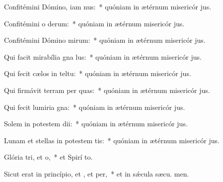 \item Confitémini Dómino, iam nus:~* quóniam in ætérnum misericór jus.
\item Confitémini o derum:~* quóniam in ætérnum misericór jus.
\item Confitémini Dómino mirum:~* quóniam in ætérnum misericór jus.
\item Qui facit mirabília gna lus:~* quóniam in ætérnum misericór jus.
\item Qui fecit cælos in teltu:~* quóniam in ætérnum misericór jus.
\item Qui firmávit terram per quas:~* quóniam in ætérnum misericór jus.
\item Qui fecit lumiria gna:~* quóniam in ætérnum misericór jus.
\item Solem in potestem dii:~* quóniam in ætérnum misericór jus.
\item Lunam et stellas in potestem tis:~* quóniam in ætérnum misericór jus.
\item Glória tri, et o,~* et Spirí to.
\item Sicut erat in princípio, et , et per,~* et in sǽcula sæcu. men.
